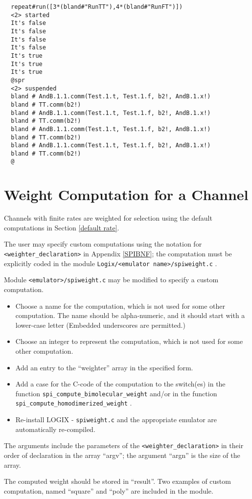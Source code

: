 \begin{verbatim}
  repeat#run([3*(bland#"RunTT"),4*(bland#"RunFT")]) 
  <2> started
  It's false
  It's false
  It's false
  It's false
  It's true
  It's true
  It's true
  @spr
  <2> suspended
  bland # AndB.1.1.comm(Test.1.t, Test.1.f, b2!, AndB.1.x!)
  bland # TT.comm(b2!)
  bland # AndB.1.1.comm(Test.1.t, Test.1.f, b2!, AndB.1.x!)
  bland # TT.comm(b2!)
  bland # AndB.1.1.comm(Test.1.t, Test.1.f, b2!, AndB.1.x!)
  bland # TT.comm(b2!)
  bland # AndB.1.1.comm(Test.1.t, Test.1.f, b2!, AndB.1.x!)
  bland # TT.comm(b2!)
  @
\end{verbatim}

\section{Weight Computation for a Channel}
Channels with finite rates are weighted for selection using the
default computations in Section \ref{default rate}.

\noindent
The user may specify custom computations using the notation for\linebreak
\verb+<weighter_declaration>+
in Appendix \ref{SPIBNF}; the computation must be explicitly coded in
the module \verb+Logix/<emulator name>/spiweight.c+ .

\noindent
Module \verb+<emulator>/spiweight.c+ may be modified to
specify a custom computation.

\begin{itemize}
\item Choose a name for the computation, which is not used for some
other computation.  The name should be
alpha-numeric, and it should start with a lower-case letter (Embedded
underscores are permitted.)
\item Choose an integer to represent the computation, which is not used for
some other computation.
\item Add an entry to the ``weighter'' array in the specified form.
\item Add a case for the C-code of the computation to the switch(es)
in the function
\verb+spi_compute_bimolecular_weight+ and/or in the function
\verb+spi_compute_homodimerized_weight+ .
\item Re-install LOGIX - \verb+spiweight.c+ and the
appropriate emulator are automatically re-compiled.
\end{itemize}

\noindent
The arguments include the parameters of the
\verb+<weighter_declaration>+ in their order of declaration in
the array ``argv''; the argument ``argn'' is the size of the
array.

\noindent
The computed weight should be stored in ``result''.  Two
examples of custom computation, named ``square'' and ``poly''
are included in the module.

\newpage





